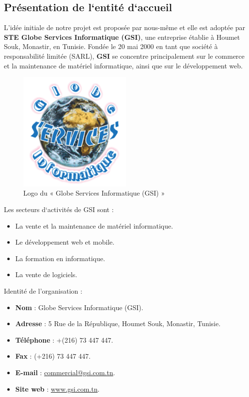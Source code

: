 \subsection{Présentation de l`entité d`accueil}
L’idée initiale de notre projet est proposée par nous-même et elle est adoptée par \textbf{STE Globe Services Informatique (GSI)}, une entreprise établie à Houmet Souk, Monastir, en Tunisie. Fondée le 20 mai 2000 en tant que société à responsabilité limitée (SARL), \textbf{GSI} se concentre principalement sur le commerce et la maintenance de matériel informatique, ainsi que sur le développement web.
\begin{figure}[ht]
    \centering
    \includegraphics[width=0.5\textwidth]{images/gsi-logo.png}
    \caption{Logo du « Globe Services Informatique (GSI) »}
    \label{fig:gsi-logo}    
\end{figure}

Les secteurs d`activités de GSI sont :
\begin{itemize}[itemsep=2pt, parsep=2pt]
    \item La vente et la maintenance de matériel informatique.
    \item Le développement web et mobile.
    \item La formation en informatique.
    \item La vente de logiciels.
\end{itemize}

Identité de l'organisation :
\begin{itemize}[itemsep=2pt, parsep=2pt]
    \item \textbf{Nom} : Globe Services Informatique (GSI).
    \item \textbf{Adresse} : 5 Rue de la République, Houmet Souk, Monastir, Tunisie.
    \item \textbf{Téléphone} : +(216) 73 447 447.
    \item \textbf{Fax} : (+216) 73 447 447.
    \item \textbf{E-mail} : \href{mailto:commercial@gsi.com.tn}{commercial@gsi.com.tn}.
    \item \textbf{Site web} : \href{https://www.gsi.com.tn/}{www.gsi.com.tn}.
\end{itemize}

